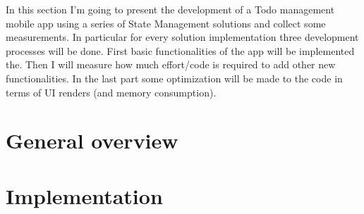 In this section I’m going to present the development of a Todo management mobile app using a series of State Management solutions and collect some measurements. In particular for every solution implementation three development processes will be done. First basic functionalities of the app will be implemented the. Then I will measure how much effort/code is required to add other new functionalities. In the last part some optimization will be made to the code in terms of UI renders (and memory consumption).
\section{General overview}
\label{sec:general_overview}


\section{Implementation}
\label{sec:implementation}


